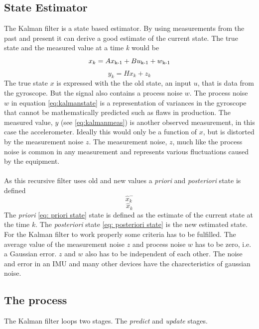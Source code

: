 \documentclass[a4paper,11pt]{kth-mag}
\begin{document}
\subsection{State Estimator}
The Kalman filter is a state based estimator. By using measurements from the past and present it can derive a good estimate of the current state. The true state and the measured value at a time \textit{k} would be
\begin{equation}\label{eq:kalmanstate}
x_k = Ax\textsubscript{k-1}+Bu\textsubscript{k-1}+w\textsubscript{k-1}
\end{equation}
\begin{equation} \label{eq:kalmanmeas}
y_k = Hx_k + z_k
\end{equation}
The true state $x$ is expressed with the the old state, an input $u$, that is data from the gyroscope. But the signal also contains a process noise $w$. The process noise $w$ in equation \eqref{eq:kalmanstate} is a representation of variances in the gyroscope that cannot be mathematically predicted such as flaws in production. 
The measured value, $y$ (see \eqref{eq:kalmanmeas}) is another observed measurement, in this case the accelerometer. Ideally this would only be a function of $x$, but is distorted by the measurement noise $z$.
The measurement noise, $z$, much like the process noise is common in any measurement and represents various fluctuations caused by the equipment.
\\ \\
As this recursive filter uses old and new values a \textit{priori} and \textit{posteriori} state is defined
\begin{equation} \label{eq: priori state}
\hat{x}^-_k
\end{equation}
\begin{equation} \label{eq: posteriori state}
\hat{x}_k
\end{equation}
The \textit{priori} \eqref{eq: priori state} state is defined as the estimate of the current state at the time $k$. The \textit{posteriori} state \eqref{eq: posteriori state} is the new estimated state.
For the Kalman filter to work properly some criteria has to be fulfilled. The average value of the measurement noise $z$ and process noise $w$ has to be zero, i.e. a Gaussian error. $z$ and $w$ also has to be independent of  each other. The noise and error in an IMU and many other devices have the charecteristics of gaussian noise.

\subsection{The process} 
The Kalman filter loops two stages. The \textit{predict} and \textit{update} stages.
 
\end{document}
